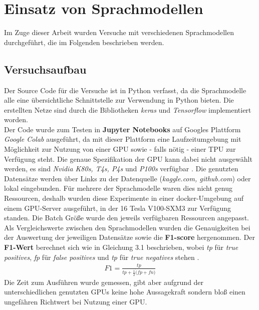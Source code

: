 \chapter{Einsatz von Sprachmodellen}
Im Zuge dieser Arbeit wurden Versuche mit verschiedenen Sprachmodellen durchgef\"uhrt, die im Folgenden beschrieben werden.

\section{Versuchsaufbau}
Der Source Code f\"ur die Versuche ist in Python verfasst, da die Sprachmodelle alle eine \"ubersichtliche Schnittstelle zur Verwendung in Python bieten. Die erstellten Netze sind durch die Bibliotheken \textit{keras} \cite{keras} und \textit{Tensorflow} \cite{tensorflow} implementiert worden. \\
Der Code wurde zum Testen in \textbf{Jupyter Notebooks} auf Googles Plattform \textit{Google Colab} \cite{colab} ausgef\"uhrt, da mit dieser Plattform eine Laufzeitumgebung mit M\"oglichkeit zur Nutzung von einer GPU sowie - falls n\"otig - einer TPU zur Verf\"ugung steht. Die genaue Spezifikation der GPU kann dabei nicht ausgew\"ahlt werden, es sind \textit{Nvidia K80s, T4s, P4s} und \textit{P100s} verf\"ugbar \cite{colab_gpu}. Die genutzten Datens\"atze werden \"uber Links zu der Datenquelle (\textit{kaggle.com, github.com}) oder lokal eingebunden. F\"ur mehrere der Sprachmodelle waren dies nicht genug Ressourcen, deshalb wurden diese Experimente in einer docker-Umgebung auf einem GPU-Server ausgef\"uhrt, in der 16 Tesla V100-SXM3 zur Verf\"ugung standen. Die Batch Gr\"o{\ss}e wurde den jeweils verf\"ugbaren Ressourcen angepasst.\\
Als Vergleichswerte zwischen den Sprachmodellen wurden die Genauigkeiten bei der Auswertung der jeweiligen Datens\"atze sowie die \textbf{F1-score} hergenommen. Der \textbf{F1-Wert} berechnet sich wie in Gleichung 3.1 beschrieben, wobei \textit{tp} f\"ur \textit{true positives}, \textit{fp} f\"ur \textit{false positives} und \textit{tp} f\"ur \textit{true negatives} stehen \cite{f1}.
\begin{align}
   F1 {=} \frac{tp}{tp + \frac{1}{2} \dot (fp + fn)}
\end{align}
Die Zeit zum Ausf\"uhren wurde gemessen, gibt aber aufgrund der unterschiedlichen genutzten GPUs keine hohe Aussagekraft sondern blo{\ss} einen ungef\"ahren Richtwert bei Nutzung einer GPU.

